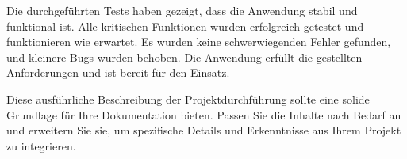 Die durchgeführten Tests haben gezeigt, dass die Anwendung stabil und funktional ist. Alle kritischen Funktionen wurden erfolgreich getestet und funktionieren wie erwartet. Es wurden keine schwerwiegenden Fehler gefunden, und kleinere Bugs wurden behoben. Die Anwendung erfüllt die gestellten Anforderungen und ist bereit für den Einsatz.

Diese ausführliche Beschreibung der Projektdurchführung sollte eine solide Grundlage für Ihre Dokumentation bieten. Passen Sie die Inhalte nach Bedarf an und erweitern Sie sie, um spezifische Details und Erkenntnisse aus Ihrem Projekt zu integrieren.








